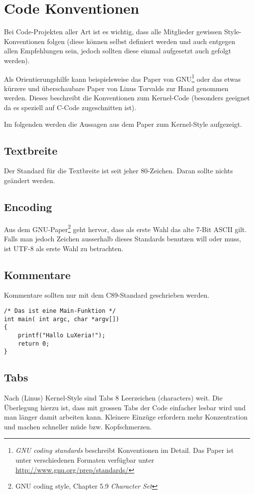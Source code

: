 \section{Code Konventionen}
Bei Code-Projekten aller Art ist es wichtig, dass alle Mitglieder gewissen
Style-Konventionen folgen (diese können selbst definiert werden und auch
entgegen allen Empfehlungen sein, jedoch sollten diese einmal aufgesetzt
auch gefolgt werden).

Als Orientierungshilfe kann beispielsweise das Paper von GNU\footnote{
    \emph{GNU coding standards} beschreibt Konventionen im Detail.
    Das Paper ist unter verschiedenen Formaten verfügbar unter 
    \url{http://www.gnu.org/prep/standards/}}
oder das etwas kürzere und überschaubare Paper von Linus Torvalds zur 
Hand genommen werden. Dieses beschreibt die Konventionen zum Kernel-Code
(besonders geeignet da es speziell auf C-Code zugeschnitten ist).

Im folgenden werden die Aussagen aus dem Paper zum Kernel-Style
aufgezeigt.

\subsection{Textbreite}
Der Standard für die Textbreite ist seit jeher 80-Zeichen. Daran sollte
nichts geändert werden. 

\subsection{Encoding}
Aus dem GNU-Paper\footnote{
    GNU coding style, Chapter 5.9 \emph{Character Set}}
geht hervor, dass als erste Wahl das alte 7-Bit ASCII
gilt. Falls man jedoch Zeichen ausserhalb dieses Standards benutzen will
oder muss, ist UTF-8 als erste Wahl zu betrachten.

\subsection{Kommentare}
Kommentare sollten nur mit dem C89-Standard geschrieben werden.

\begin{lstlisting}
/* Das ist eine Main-Funktion */
int main( int argc, char *argv[])
{
    printf("Hallo LuXeria!");
    return 0;
}
\end{lstlisting}

\subsection{Tabs}
Nach (Linus) Kernel-Style sind Tabs 8 Leerzeichen (characters) weit.
Die Überlegung hierzu ist, dass mit grossen Tabs der Code einfacher lesbar
wird und man länger damit arbeiten kann. Kleinere Einzüge erfordern mehr
Konzentration und machen schneller müde bzw. Kopfschmerzen.

